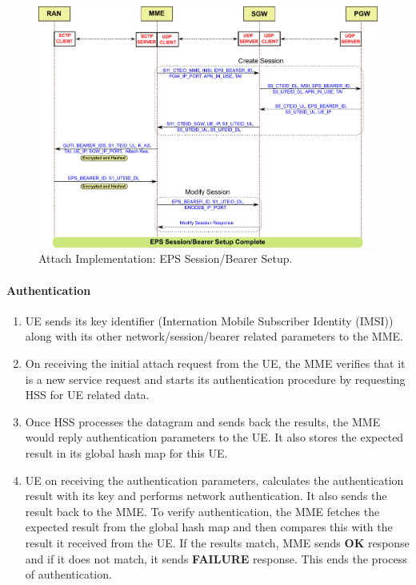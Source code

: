 \documentclass[hidelinks]{report}
\begin{document}
\begin{figure}[h]

\centering
\includegraphics[scale=0.5]{nfv_eps_conn}
\caption{Attach Implementation: EPS Session/Bearer Setup.}
\label{nfv_eps_conn}

\end{figure}

\paragraph*{Authentication}

\begin{enumerate}

\item UE sends its key identifier (Internation Mobile Subscriber Identity (IMSI)) along with its other network/session/bearer related parameters to the MME.

\item On receiving the initial attach request from the UE, the MME verifies that it is a new service request and starts its authentication procedure by requesting HSS for UE related data.

\item Once HSS processes the datagram and sends back the results, the MME would reply authentication parameters to the UE. It also stores the expected result in its global hash map for this UE.

\item UE on receiving the authentication parameters, calculates the authentication result with its key and performs network authentication. It also sends the result back to the MME. To verify authentication, the MME fetches the expected result from the global hash map and then compares this with the result it received from the UE. If the results match, MME sends \textbf{OK} response and if it does not match, it sends \textbf{FAILURE} response. This ends the process of authentication.

\end{enumerate}
\end{document}

